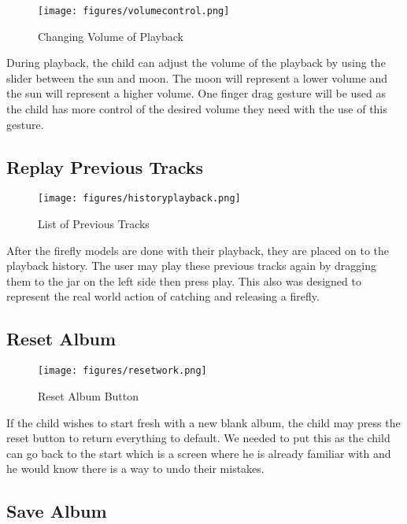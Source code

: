 \begin{figure}[H]
    \centering
    \texttt{[image: figures/volumecontrol.png]}
    \caption{Changing Volume of Playback}
    \label{fig:volcontrol}
\end{figure}

During playback, the child can adjust the volume of the playback by using the slider between the sun and moon. The moon will represent a lower volume and the sun will represent a higher volume. One finger drag gesture will be used as the child has more control of the desired volume they need with the use of this gesture.

\subsection{Replay Previous Tracks}

\begin{figure}[H]
    \centering
    \texttt{[image: figures/historyplayback.png]}
    \caption{List of Previous Tracks}
    \label{fig:firefly2}
\end{figure}

After the firefly models are done with their playback, they are placed on to the playback history. The user may play these previous tracks again by dragging them to the jar on the left side then press play. This also was designed to represent the real world action of catching and releasing a firefly.

\subsection{Reset Album}

\begin{figure}[H]
    \centering
    \texttt{[image: figures/resetwork.png]}
    \caption{Reset Album Button}
    \label{fig:firefly2}
\end{figure}

If the child wishes to start fresh with a new blank album, the child may press the reset button to return everything to default. We needed to put this as the child can go back to the start which is a screen where he is already familiar with and he would know there is a way to undo their mistakes.

\subsection{Save Album}

